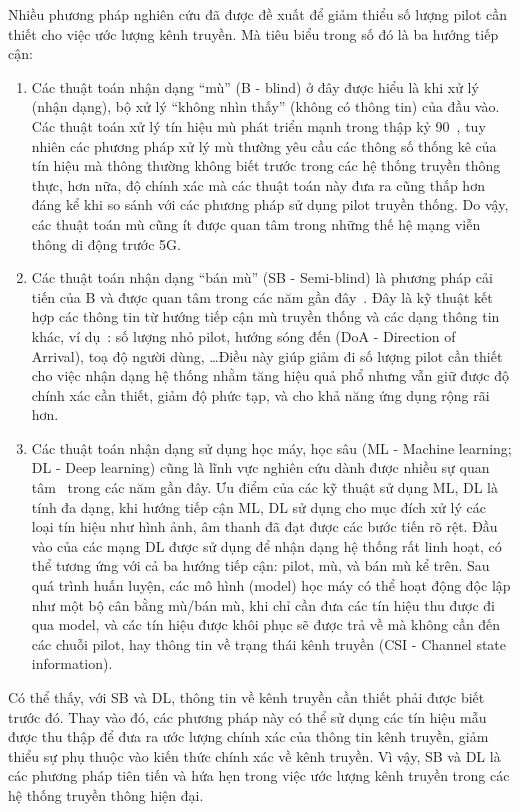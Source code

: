 Nhiều phương pháp nghiên cứu đã được đề xuất để giảm thiểu số lượng pilot cần thiết cho việc ước lượng kênh truyền. Mà tiêu biểu trong số đó là ba hướng tiếp cận: 
\begin{enumerate}
    \item Các thuật toán nhận dạng ``mù'' (B - blind) ở đây được hiểu là khi xử lý (nhận dạng), bộ xử lý ``không nhìn thấy'' (không có thông tin) của đầu vào. Các thuật toán xử lý tín hiệu mù phát triển mạnh trong thập kỷ 90~\cite{abed1997}, tuy nhiên các phương pháp xử lý mù thường yêu cầu các thông số thống kê của tín hiệu mà thông thường không biết trước trong các hệ thống truyền thông thực, hơn nữa, độ chính xác mà các thuật toán này đưa ra cũng thấp hơn đáng kể khi so sánh với các phương pháp sử dụng pilot truyền thống. Do vậy, các thuật toán mù cũng ít được quan tâm trong những thế hệ mạng viễn thông di động trước 5G.

    \item Các thuật toán nhận dạng ``bán mù'' (SB - Semi-blind) là phương pháp cải tiến của B và được quan tâm trong các năm gần đây~\cite{Ladaycia2017, Ladaycia2019, shaik2021}. Đây là kỹ thuật kết hợp các thông tin từ hướng tiếp cận mù truyền thống và các dạng thông tin khác, ví dụ~\cite{Rekik2021}: số lượng nhỏ pilot, hướng sóng đến (DoA - Direction of Arrival), toạ độ người dùng, \ldots Điều này giúp giảm đi số lượng pilot cần thiết cho việc nhận dạng hệ thống nhằm tăng hiệu quả phổ nhưng vẫn giữ được độ chính xác cần thiết, giảm độ phức tạp, và cho khả năng ứng dụng rộng rãi hơn.

    \item Các thuật toán nhận dạng sử dụng học máy, học sâu (ML - Machine learning; DL - Deep learning) cũng là lĩnh vực nghiên cứu dành được nhiều sự quan tâm~\cite{Zhang2019} trong các năm gần đây. Ưu điểm của các kỹ thuật sử dụng ML, DL là tính đa dạng, khi hướng tiếp cận ML, DL sử dụng cho mục đích xử lý các loại tín hiệu như hình ảnh, âm thanh đã đạt được các bước tiến rõ rệt. Đầu vào của các mạng DL được sử dụng để nhận dạng hệ thống rất linh hoạt, có thể tương ứng với cả ba hướng tiếp cận: pilot, mù, và bán mù kể trên. Sau quá trình huấn luyện, các mô hình (model) học máy có thể hoạt động độc lập như một bộ cân bằng mù/bán mù, khi chỉ cần đưa các tín hiệu thu được đi qua model, và các tín hiệu được khôi phục sẽ được trả về mà không cần đến các chuỗi pilot, hay thông tin về trạng thái kênh truyền (CSI - Channel state information).
\end{enumerate}

Có thể thấy, với SB và DL, thông tin về kênh truyền cần thiết phải được biết trước đó. Thay vào đó, các phương pháp này có thể sử dụng các tín hiệu mẫu được thu thập để đưa ra ước lượng chính xác của thông tin kênh truyền, giảm thiểu sự phụ thuộc vào kiến thức chính xác về kênh truyền. Vì vậy, SB và DL là các phương pháp tiên tiến và hứa hẹn trong việc ước lượng kênh truyền trong các hệ thống truyền thông hiện đại.


